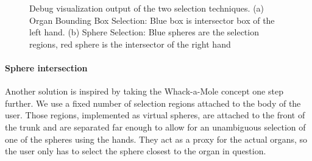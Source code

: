 \begin{figure}[htb]
	\centering
	\caption{Debug visualization output of the two selection techniques. (a) Organ Bounding Box Selection: Blue box is intersector box of the left hand. (b) Sphere Selection: Blue spheres are the selection regions, red sphere is the intersector of the right hand}
	\label{fig:3-IMR:organGamingBoundingBoxSelection}
\end{figure}
\paragraph{Sphere intersection}
Another solution is inspired by taking the Whack-a-Mole concept one step further. We use a fixed number of selection regions attached to the body of the user. Those regions, implemented as virtual spheres, are attached to the front of the trunk and are separated far enough to allow for an unambiguous selection of one of the spheres using the hands. They act as a proxy for the actual organs, so the user only has to select the sphere closest to the organ in question.

